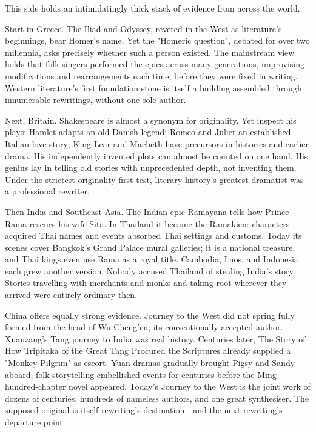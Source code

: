 This side holds an intimidatingly thick stack of evidence from across the world.

Start in Greece. The Iliad and Odyssey, revered in the West as literature's beginnings, bear Homer's name. Yet the "Homeric question", debated for over two millennia, asks precisely whether such a person existed. The mainstream view holds that folk singers performed the epics across many generations, improvising modifications and rearrangements each time, before they were fixed in writing. Western literature's first foundation stone is itself a building assembled through innumerable rewritings, without one sole author.

Next, Britain. Shakespeare is almost a synonym for originality. Yet inspect his plays: Hamlet adapts an old Danish legend; Romeo and Juliet an established Italian love story; King Lear and Macbeth have precursors in histories and earlier drama. His independently invented plots can almost be counted on one hand. His genius lay in telling old stories with unprecedented depth, not inventing them. Under the strictest originality-first test, literary history's greatest dramatist was a professional rewriter.

Then India and Southeast Asia. The Indian epic Ramayana tells how Prince Rama rescues his wife Sita. In Thailand it became the Ramakien: characters acquired Thai names and events absorbed Thai settings and customs. Today its scenes cover Bangkok's Grand Palace mural galleries; it is a national treasure, and Thai kings even use Rama as a royal title. Cambodia, Laos, and Indonesia each grew another version. Nobody accused Thailand of stealing India's story. Stories travelling with merchants and monks and taking root wherever they arrived were entirely ordinary then.

China offers equally strong evidence. Journey to the West did not spring fully formed from the head of Wu Cheng'en, its conventionally accepted author. Xuanzang's Tang journey to India was real history. Centuries later, The Story of How Tripitaka of the Great Tang Procured the Scriptures already supplied a "Monkey Pilgrim" as escort. Yuan dramas gradually brought Pigsy and Sandy aboard; folk storytelling embellished events for centuries before the Ming hundred-chapter novel appeared. Today's Journey to the West is the joint work of dozens of centuries, hundreds of nameless authors, and one great synthesiser. The supposed original is itself rewriting's destination---and the next rewriting's departure point.


